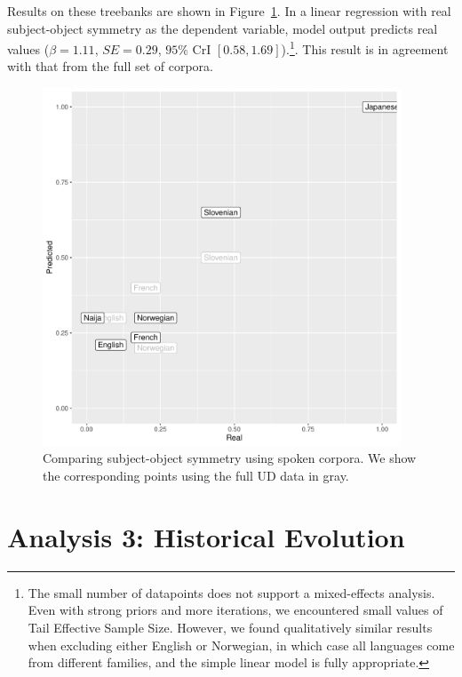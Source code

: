 \documentclass[11pt,a4paper]{article}
\newcommand\mhahn[1]{{\color{red}(#1)}}
\begin{document}
Results on these treebanks are shown in Figure~\ref{fig:spoken}.
In a linear regression with real subject-object symmetry as the dependent variable, model output predicts real values ($\beta=1.11$, $SE=0.29$, $95\%$ CrI $[0.58, 1.69]$).\footnote{The small number of datapoints does not support a mixed-effects analysis. Even with strong priors and more iterations, we encountered small values of Tail Effective Sample Size. However, we found qualitatively similar results when excluding either English or Norwegian, in which case all languages come from different families, and the simple linear model is fully appropriate.}.
This result is in agreement with that from the full set of corpora.

\begin{figure}
    \centering
    \includegraphics[width=0.95\textwidth]{analysis_spoken/spoken.pdf}
    \caption{Comparing subject-object symmetry using spoken corpora. We show the corresponding points using the full UD data in gray.}
    \label{fig:spoken}
\end{figure}



\section{Analysis 3: Historical Evolution}
\end{document}
